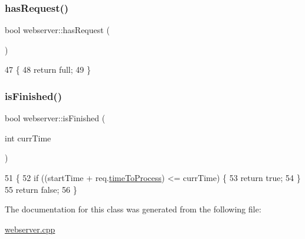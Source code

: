 \subsubsection{\texorpdfstring{has\+Request()}{hasRequest()}}
{\footnotesize\ttfamily bool webserver\+::has\+Request (\begin{DoxyParamCaption}{ }\end{DoxyParamCaption})\hspace{0.3cm}{\ttfamily [inline]}}


\begin{DoxyCode}
47                           \{
48             \textcolor{keywordflow}{return} full;
49         \}
\end{DoxyCode}
\mbox{\label{classwebserver_ab0d202209647832942f60806dd3835ef}} 
\subsubsection{\texorpdfstring{is\+Finished()}{isFinished()}}
{\footnotesize\ttfamily bool webserver\+::is\+Finished (\begin{DoxyParamCaption}\item[{int}]{curr\+Time }\end{DoxyParamCaption})\hspace{0.3cm}{\ttfamily [inline]}}


\begin{DoxyCode}
51                                       \{
52             \textcolor{keywordflow}{if} ((startTime + req.\hyperlink{structrequest_aab0c9ef2df6d6c10f057a0066908cce2}{timeToProcess}) <= currTime) \{
53                 \textcolor{keywordflow}{return} \textcolor{keyword}{true};
54             \}
55             \textcolor{keywordflow}{return} \textcolor{keyword}{false};
56         \}
\end{DoxyCode}


The documentation for this class was generated from the following file\+:\begin{DoxyCompactItemize}
\item 
\hyperlink{webserver_8cpp}{webserver.\+cpp}\end{DoxyCompactItemize}
